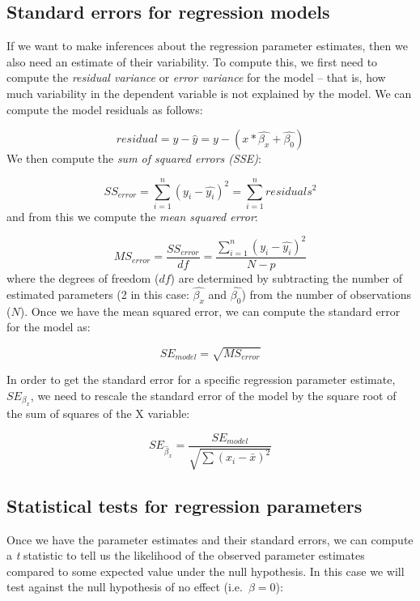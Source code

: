 \documentclass[
  12pt,
]{book}
\begin{document}
\hypertarget{standard-errors-for-regression-models}{%
\subsection{Standard errors for regression models}\label{standard-errors-for-regression-models}}

If we want to make inferences about the regression parameter estimates, then we also need an estimate of their variability. To compute this, we first need to compute the \emph{residual variance} or \emph{error variance} for the model -- that is, how much variability in the dependent variable is not explained by the model. We can compute the model residuals as follows:

\[
residual = y - \hat{y} = y - (x*\hat{\beta_x} + \hat{\beta_0})
\]
We then compute the \emph{sum of squared errors (SSE)}:

\[
SS_{error} = \sum_{i=1}^n{(y_i - \hat{y_i})^2} = \sum_{i=1}^n{residuals^2}
\]
and from this we compute the \emph{mean squared error}:

\[
MS_{error} = \frac{SS_{error}}{df} = \frac{\sum_{i=1}^n{(y_i - \hat{y_i})^2} }{N - p}
\]
where the degrees of freedom (\(df\)) are determined by subtracting the number of estimated parameters (2 in this case: \(\hat{\beta_x}\) and \(\hat{\beta_0}\)) from the number of observations (\(N\)). Once we have the mean squared error, we can compute the standard error for the model as:

\[
SE_{model} = \sqrt{MS_{error}}
\]

In order to get the standard error for a specific regression parameter estimate, \(SE_{\beta_x}\), we need to rescale the standard error of the model by the square root of the sum of squares of the X variable:

\[
SE_{\hat{\beta}_x} = \frac{SE_{model}}{\sqrt{{\sum{(x_i - \bar{x})^2}}}}
\]

\hypertarget{statistical-tests-for-regression-parameters}{%
\subsection{Statistical tests for regression parameters}\label{statistical-tests-for-regression-parameters}}

Once we have the parameter estimates and their standard errors, we can compute a \emph{t} statistic to tell us the likelihood of the observed parameter estimates compared to some expected value under the null hypothesis. In this case we will test against the null hypothesis of no effect (i.e.~\(\beta=0\)):
\end{document}
